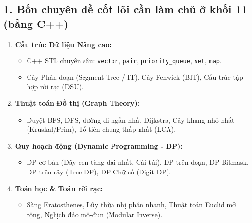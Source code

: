 \documentclass[11pt,a4paper]{article}
\begin{document}
\subsection*{\color{AsianBlue}\normalsize 1. Bốn chuyên đề cốt lõi cần làm chủ ở khối 11 (bằng C++)}
\begin{enumerate}
    \setlength{\itemsep}{2pt}
    \item \textbf{Cấu trúc Dữ liệu Nâng cao:}
    \begin{itemize}
        \item C++ STL chuyên sâu: \texttt{vector}, \texttt{pair}, \texttt{priority\_queue}, \texttt{set}, \texttt{map}.
        \item Cây Phân đoạn (Segment Tree / IT), Cây Fenwick (BIT), Cấu trúc tập hợp rời rạc (DSU).
    \end{itemize}
    \item \textbf{Thuật toán Đồ thị (Graph Theory):}
    \begin{itemize}
        \item Duyệt BFS, DFS, đường đi ngắn nhất Dijkstra, Cây khung nhỏ nhất (Kruskal/Prim), Tổ tiên chung thấp nhất (LCA).
    \end{itemize}
    \item \textbf{Quy hoạch động (Dynamic Programming - DP):}
    \begin{itemize}
        \item DP cơ bản (Dãy con tăng dài nhất, Cái túi), DP trên đoạn, DP Bitmask, DP trên cây (Tree DP), DP Chữ số (Digit DP).
    \end{itemize}
    \item \textbf{Toán học \& Toán rời rạc:}
    \begin{itemize}
        \item Sàng Eratosthenes, Lũy thừa nhị phân nhanh, Thuật toán Euclid mở rộng, Nghịch đảo mô-đun (Modular Inverse).
    \end{itemize}
\end{enumerate}
\end{document}
